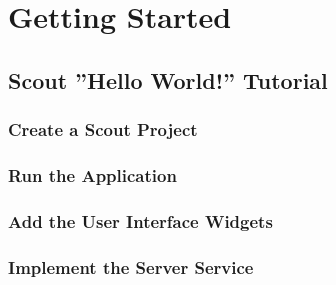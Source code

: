\documentclass[a4paper,10pt,twoside]{book}
\begin{document}
\thispagestyle{empty}
\frontmatter




\pagestyle{plain}

\tableofcontents
\sloppy

\mainmatter


\pagestyle{headings}

\chapter*{Getting Started}

\section*{Scout ''Hello World!'' Tutorial}
\subsection*{Create a Scout Project}

\subsection*{Run the Application}

\subsection*{Add the User Interface Widgets}

\subsection*{Implement the Server Service}

\end{document}
